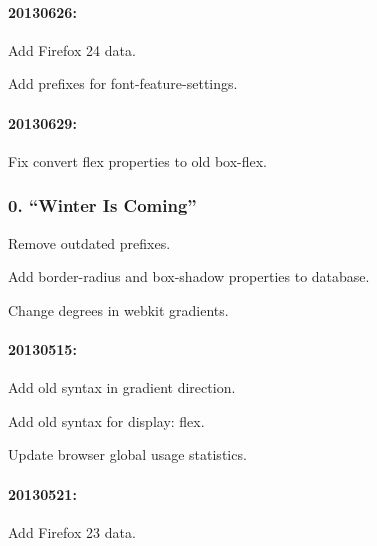 \paragraph*{20130626\+:}


\begin{DoxyItemize}
\item Add Firefox 24 data.
\item Add prefixes for font-\/feature-\/settings.
\end{DoxyItemize}

\paragraph*{20130629\+:}


\begin{DoxyItemize}
\item Fix convert flex properties to old box-\/flex.
\end{DoxyItemize}

\subsubsection*{0. “\+Winter Is Coming”}


\begin{DoxyItemize}
\item Remove outdated prefixes.
\item Add border-\/radius and box-\/shadow properties to database.
\item Change degrees in webkit gradients.
\end{DoxyItemize}

\paragraph*{20130515\+:}


\begin{DoxyItemize}
\item Add old syntax in gradient direction.
\item Add old syntax for display\+: flex.
\item Update browser global usage statistics.
\end{DoxyItemize}

\paragraph*{20130521\+:}


\begin{DoxyItemize}
\item Add Firefox 23 data.
\end{DoxyItemize}

